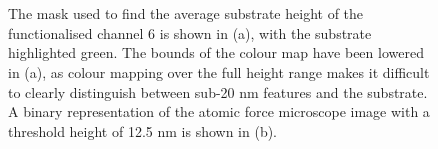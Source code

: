 \documentclass[
  a4paper,
]{scrbook}
\begin{document}
\begin{figure}
\begin{minipage}[t]{0.03\linewidth}
{\centering 


}

\end{minipage}%
%
\begin{minipage}[t]{0.01\linewidth}

{\centering 

~

}

\end{minipage}%
%
\begin{minipage}[t]{0.45\linewidth}

{\centering 


}

\end{minipage}%
%
\begin{minipage}[t]{0.01\linewidth}

{\centering 

~

}

\end{minipage}%

\caption{\label{fig-OR22a-variability-AFM-comparison}The mask used to
find the average substrate height of the functionalised channel 6 is
shown in (a), with the substrate highlighted green. The bounds of the
colour map have been lowered in (a), as colour mapping over the full
height range makes it difficult to clearly distinguish between sub-20 nm
features and the substrate. A binary representation of the atomic force
microscope image with a threshold height of 12.5 nm is shown in (b).}

\end{figure}
\end{document}
